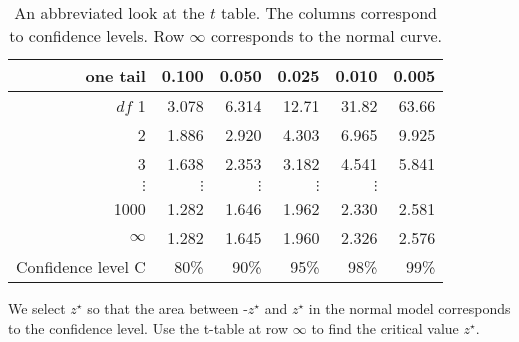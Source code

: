 \begin{table}[hht]
\centering
\begin{tabular}{r | rrr rr}
one tail & \hspace{1.5mm}  0.100 & \hspace{1.5mm} 0.050 & \hspace{1.5mm} 0.025 & \hspace{1.5mm} 0.010 & \hspace{1.5mm} 0.005  \\
\hline
{$df$} \hfill 1  &  {\normalsize  3.078} & {\normalsize  6.314} & {\normalsize 12.71} & {\normalsize 31.82} & {\normalsize 63.66}  \\ 
2  &  {\normalsize  1.886} & {\normalsize  2.920} & {\normalsize  4.303} & {\normalsize  6.965} & {\normalsize  9.925}  \\ 
3  &  {\normalsize  1.638} & {\normalsize  2.353} & {\normalsize  3.182} & {\normalsize  4.541} & {\normalsize  5.841}  \\ 
$\vdots$ & $\vdots$ &$\vdots$ &$\vdots$ &$\vdots$ & \\
1000  &  {\normalsize  1.282} & {\normalsize  1.646} & {\normalsize  1.962} & {\normalsize  2.330} & {\normalsize  2.581}  \\ 
$\infty$   &  {\normalsize  1.282} & {\normalsize  1.645} & {\normalsize  1.960} & {\normalsize  2.326} & {\normalsize  2.576}   \\
\hline
Confidence level C  &  {\normalsize  80\%} & {\normalsize 90\%} & {\normalsize 95\%} & {\normalsize  98\%} & {\normalsize  99\%}  \\
\hline
\end{tabular}
\caption{An abbreviated look at the $t$ table. The columns correspond to confidence levels.  Row $\infty$ corresponds to the normal curve.}
\label{tTableSample}
\end{table}


\begin{tipBox}{We select $z^{\star}$ so that the area between -$z^{\star}$ and $z^{\star}$ in the normal model corresponds to the confidence level.  Use the t-table at row $\infty$ to find the critical value $z^{\star}$.}
\end{tipBox}


